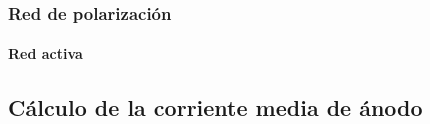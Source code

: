 \documentclass{beamer}
\begin{document}
\begin{frame}
\frametitle{Red de polarización}
\framesubtitle{Red activa}
\begin{center}
\end{center}
\end{frame}


\subsection{Cálculo de la corriente media de ánodo}
\end{document}
